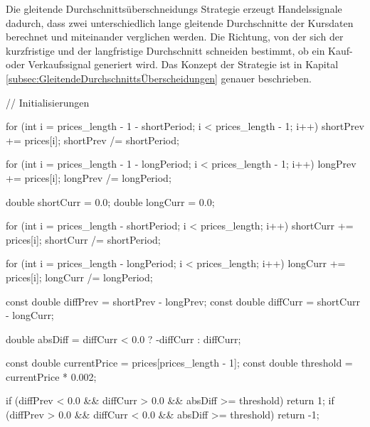 Die gleitende Durchschnittsüberschneidungs Strategie erzeugt Handelssignale dadurch, dass zwei unterschiedlich lange gleitende Durchschnitte der Kursdaten berechnet und miteinander verglichen werden.
Die Richtung, von der sich der kurzfristige und der langfristige Durchschnitt schneiden bestimmt, ob ein Kauf- oder Verkaufssignal generiert wird.
Das Konzept der Strategie ist in Kapital \ref{subsec:GleitendeDurchschnittsÜberscheidungen} genauer beschrieben.

\begin{CCode}[caption={Durchschnittsüberschneidung in C}, label={lst:DurchschnittsüberschneidunginC}]
    // Initialisierungen

    for (int i = prices_length - 1 - shortPeriod; i < prices_length - 1; i++) {
        shortPrev += prices[i];
    }
    shortPrev /= shortPeriod;

    for (int i = prices_length - 1 - longPeriod; i < prices_length - 1; i++) {
        longPrev += prices[i];
    }
    longPrev /= longPeriod;

    double shortCurr = 0.0;
    double longCurr = 0.0;

    for (int i = prices_length - shortPeriod; i < prices_length; i++) {
        shortCurr += prices[i];
    }
    shortCurr /= shortPeriod;

    for (int i = prices_length - longPeriod; i < prices_length; i++) {
        longCurr += prices[i];
    }
    longCurr /= longPeriod;

    const double diffPrev = shortPrev - longPrev;
    const double diffCurr = shortCurr - longCurr;

    double absDiff = diffCurr < 0.0 ? -diffCurr : diffCurr;

    const double currentPrice = prices[prices_length - 1];
    const double threshold = currentPrice * 0.002;

    if (diffPrev < 0.0 && diffCurr > 0.0 && absDiff >= threshold) {
        return 1;
    }
    if (diffPrev > 0.0 && diffCurr < 0.0 && absDiff >= threshold) {
        return -1;
    }
\end{CCode}

